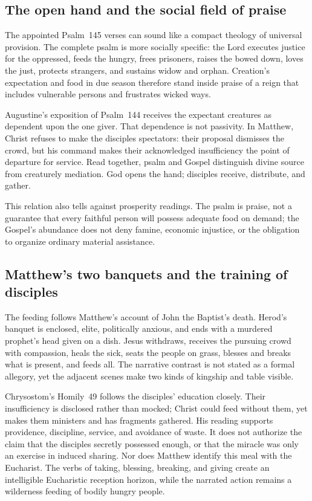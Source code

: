 \subsection*{The open hand and the social field of praise}

The appointed Psalm~145 verses can sound like a compact theology of universal
provision. The complete psalm is more socially specific: the Lord executes
justice for the oppressed, feeds the hungry, frees prisoners, raises the bowed
down, loves the just, protects strangers, and sustains widow and orphan.
Creation's expectation and food in due season therefore stand inside praise of
a reign that includes vulnerable persons and frustrates wicked ways.

Augustine's exposition of Psalm~144 receives the expectant creatures as
dependent upon the one giver. That dependence is not passivity. In Matthew,
Christ refuses to make the disciples spectators: their proposal dismisses the
crowd, but his command makes their acknowledged insufficiency the point of
departure for service. Read together, psalm and Gospel distinguish divine
source from creaturely mediation. God opens the hand; disciples receive,
distribute, and gather.

This relation also tells against prosperity readings. The psalm is praise,
not a guarantee that every faithful person will possess adequate food on
demand; the Gospel's abundance does not deny famine, economic injustice, or the obligation to organize ordinary material assistance.

\subsection*{Matthew's two banquets and the training of disciples}

The feeding follows Matthew's account of John the Baptist's death. Herod's
banquet is enclosed, elite, politically anxious, and ends with a murdered
prophet's head given on a dish. Jesus withdraws, receives the pursuing crowd
with compassion, heals the sick, seats the people on grass, blesses and breaks
what is present, and feeds all. The narrative contrast is not stated as a
formal allegory, yet the adjacent scenes make two kinds of kingship and table
visible.

Chrysostom's Homily~49 follows the disciples' education closely. Their
insufficiency is disclosed rather than mocked; Christ could feed without them,
yet makes them ministers and has fragments gathered. His reading supports
providence, discipline, service, and avoidance of waste. It does not authorize
the claim that the disciples secretly possessed enough, or that the miracle
was only an exercise in induced sharing. Nor does Matthew identify this meal
with the Eucharist. The verbs of taking, blessing, breaking, and giving create
an intelligible Eucharistic reception horizon, while the narrated action
remains a wilderness feeding of bodily hungry people.

